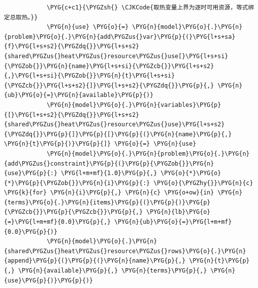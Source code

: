 \begin{Verbatim}
            \PYG{c+c1}{\PYGZsh{} \CJKCode{取热变量上界为逐时可用资源，等式绑定总取热。}}
            \PYG{n}{use} \PYG{o}{=} \PYG{n}{model}\PYG{o}{.}\PYG{n}{problem}\PYG{o}{.}\PYG{n}{add\PYGZus{}var}\PYG{p}{(}\PYG{l+s+sa}{f}\PYG{l+s+s2}{\PYGZdq{}}\PYG{l+s+s2}{shared\PYGZus{}heat\PYGZus{}resource\PYGZus{}use[}\PYG{l+s+si}{\PYGZob{}}\PYG{n}{name}\PYG{l+s+si}{\PYGZcb{}}\PYG{l+s+s2}{,}\PYG{l+s+si}{\PYGZob{}}\PYG{n}{t}\PYG{l+s+si}{\PYGZcb{}}\PYG{l+s+s2}{]}\PYG{l+s+s2}{\PYGZdq{}}\PYG{p}{,} \PYG{n}{ub}\PYG{o}{=}\PYG{n}{available}\PYG{p}{)}
            \PYG{n}{model}\PYG{o}{.}\PYG{n}{variables}\PYG{p}{[}\PYG{l+s+s2}{\PYGZdq{}}\PYG{l+s+s2}{shared\PYGZus{}heat\PYGZus{}resource\PYGZus{}use}\PYG{l+s+s2}{\PYGZdq{}}\PYG{p}{]}\PYG{p}{[}\PYG{p}{(}\PYG{n}{name}\PYG{p}{,} \PYG{n}{t}\PYG{p}{)}\PYG{p}{]} \PYG{o}{=} \PYG{n}{use}
            \PYG{n}{model}\PYG{o}{.}\PYG{n}{problem}\PYG{o}{.}\PYG{n}{add\PYGZus{}constraint}\PYG{p}{(}\PYG{p}{\PYGZob{}}\PYG{n}{use}\PYG{p}{:} \PYG{l+m+mf}{1.0}\PYG{p}{,} \PYG{o}{*}\PYG{o}{*}\PYG{p}{\PYGZob{}}\PYG{n}{i}\PYG{p}{:} \PYG{o}{\PYGZhy{}}\PYG{n}{c} \PYG{k}{for} \PYG{n}{i}\PYG{p}{,} \PYG{n}{c} \PYG{o+ow}{in} \PYG{n}{terms}\PYG{o}{.}\PYG{n}{items}\PYG{p}{(}\PYG{p}{)}\PYG{p}{\PYGZcb{}}\PYG{p}{\PYGZcb{}}\PYG{p}{,} \PYG{n}{lb}\PYG{o}{=}\PYG{l+m+mf}{0.0}\PYG{p}{,} \PYG{n}{ub}\PYG{o}{=}\PYG{l+m+mf}{0.0}\PYG{p}{)}
            \PYG{n}{model}\PYG{o}{.}\PYG{n}{shared\PYGZus{}heat\PYGZus{}resource\PYGZus{}rows}\PYG{o}{.}\PYG{n}{append}\PYG{p}{(}\PYG{p}{(}\PYG{n}{name}\PYG{p}{,} \PYG{n}{t}\PYG{p}{,} \PYG{n}{available}\PYG{p}{,} \PYG{n}{terms}\PYG{p}{,} \PYG{n}{use}\PYG{p}{)}\PYG{p}{)}
\end{Verbatim}
